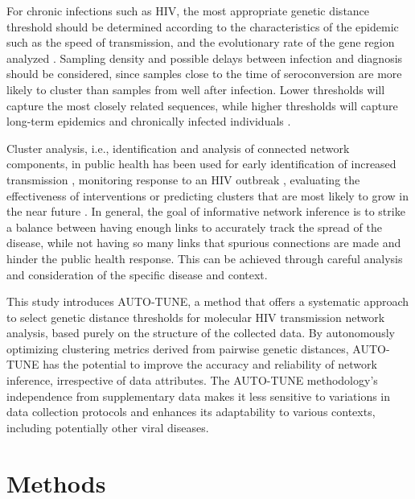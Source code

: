 \documentclass[utf8]{FrontiersinHarvard} %
\begin{document}
For chronic infections such as HIV, the most appropriate genetic distance
threshold should be determined according to the characteristics of the epidemic
such as the speed of transmission, and the evolutionary rate of the gene region
analyzed \citep{liu_dynamics_2020}. Sampling density and possible delays
between infection and diagnosis should be considered, since samples close to
the time of seroconversion are more likely to cluster than samples from well
after infection. Lower thresholds will capture the most closely related
sequences, while higher thresholds will capture long-term epidemics and
chronically infected individuals \citep{junqueira_factors_2019}.

Cluster analysis, i.e., identification and analysis of connected network
components, in public health has been used for early identification of
increased transmission \citep{oster_hiv_2021, oster_identifying_2018},
monitoring response to an HIV outbreak \citep{tumpney_human_2020,
	sizemore_using_2020, tookes_rapid_2020}, evaluating the effectiveness of
interventions \citep{peters_hiv_2016,wang_targeting_2015,liu_dynamics_2020} or
predicting clusters that are most likely to grow in the near future
\citep{erly_predictive_2021,ragonnet-cronin_forecasting_2022}. In general, the
goal of informative network inference is to strike a balance between having
enough links to accurately track the spread of the disease, while not having so
many links that spurious connections are made and hinder the public health
response. This can be achieved through careful analysis and consideration of
the specific disease and context.

This study introduces AUTO-TUNE, a method that offers a systematic approach to
select genetic distance thresholds for molecular HIV transmission network
analysis, based purely on the structure of the collected data. By autonomously
optimizing clustering metrics derived from pairwise genetic distances,
AUTO-TUNE has the potential to improve the accuracy and reliability of network
inference, irrespective of data attributes. The AUTO-TUNE methodology's
independence from supplementary data makes it less sensitive to variations in
data collection protocols and enhances its adaptability to various contexts,
including potentially other viral diseases.

\section{Methods}
\end{document}
